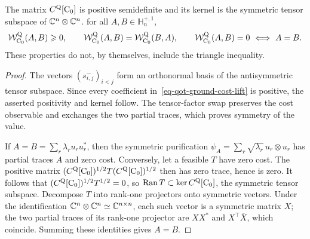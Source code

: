 \begin{prop}\label{prop-qot-ground-cost-semidistance}
The matrix $C^{\mathrm Q}[\mathrm{C}_0]$ is positive semidefinite and its kernel is the symmetric tensor subspace of $\mathbb{C}^n\otimes\mathbb{C}^n$.
for all $A,B\in\mathbb H_n^{+,1}$,
\[
\mathcal W_{\mathrm{C}_0}^{\mathrm Q}(A,B)\geqslant0,
\qquad
\mathcal W_{\mathrm{C}_0}^{\mathrm Q}(A,B)=\mathcal W_{\mathrm{C}_0}^{\mathrm Q}(B,A),
\qquad
\mathcal W_{\mathrm{C}_0}^{\mathrm Q}(A,B)=0\ \Longleftrightarrow\ A=B.
\]
These properties do not, by themselves, include the triangle inequality.
\end{prop}
\begin{proof}
The vectors $(s_{i,j}^-)_{i<j}$ form an orthonormal basis of the antisymmetric tensor subspace. Since every coefficient in~\eqref{eq-qot-ground-cost-lift} is positive, the asserted positivity and kernel follow. The tensor-factor swap preserves the cost observable and exchanges the two partial traces, which proves symmetry of the value.

If $A=B=\sum_r\lambda_r u_ru_r^*$, then the symmetric purification $\psi_A=\sum_r\sqrt{\lambda_r}\,u_r\otimes u_r$ has partial traces $A$ and zero cost. Conversely, let a feasible $T$ have zero cost. The positive matrix $(C^{\mathrm Q}[\mathrm{C}_0])^{1/2}T(C^{\mathrm Q}[\mathrm{C}_0])^{1/2}$ then has zero trace, hence is zero. It follows that $(C^{\mathrm Q}[\mathrm{C}_0])^{1/2}T^{1/2}=0$, so $\operatorname{Ran}T\subset\ker C^{\mathrm Q}[\mathrm{C}_0]$, the symmetric tensor subspace. Decompose $T$ into rank-one projectors onto symmetric vectors. Under the identification $\mathbb{C}^n\otimes\mathbb{C}^n\simeq\mathbb{C}^{n\times n}$, each such vector is a symmetric matrix $X$; the two partial traces of its rank-one projector are $XX^*$ and $X^\top\overline X$, which coincide. Summing these identities gives $A=B$.
\end{proof}
